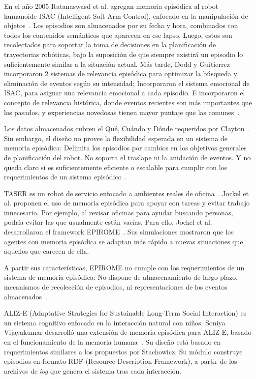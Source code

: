 En el año 2005 Ratanaswasd et al. agregan memoria episódica al robot humanoide ISAC (Intelligent Soft Arm Control), enfocado en la manipulación de objetos~\cite{Ratanaswasd2005}. Los episodios son almacenados por su fecha y hora, combinados con todos los contenidos semánticos que aparecen en ese lapso. Luego, estos son recolectados para soportar la toma de decisiones en la planificación de trayectorias robóticas, bajo la suposición de que siempre existirá un episodio lo suficientemente similar a la situación actual. Más tarde, Dodd y Guitierrez incorporaron 2 sistemas de relevancia episódica para optimizar la búsqueda y eliminación de eventos según su intensidad; Incorporaron el sistema emocional de ISAC, para asignar una relevancia emocional a cada episodio. E incorporaron el concepto de relevancia histórica, donde eventos recientes son más importantes que los pasados, y experiencias novedosas tienen mayor puntaje que las comunes~\cite{Dodd2005}.

Los datos almacenados cubren el Qué, Cuándo y Dónde requeridos por Clayton~\cite{CLAYTON20092330}. Sin embargo, el diseño no provee la flexibilidad esperada en un sistema de memoria episódica:  Delimita los episodios por cambios en los objetivos generales de planificación del robot. No soporta el traslape ni la anidación de eventos. Y no queda claro si es suficientemente eficiente o escalable para cumplir con los requerimientos de un sistema episódico~\cite{Stachowicz2012}.

TASER es un robot de servicio enfocado a ambientes reales de oficina~\cite{Jockel2007}. Jockel et al. proponen el uso de memoria episódica para apoyar con tareas y evitar trabajo innecesario. Por ejemplo, al revisar oficinas para ayudar buscando personas, podría evitar las que usualmente están vacías. Para ello, Jockel et al. desarrollaron el framework EPIROME~\cite{Jockel2007,Jockel2008}. Sus simulaciones mostraron que los agentes con memoria episódica se adaptan más rápido a nuevas situaciones que aquellos que carecen de ella.

A partir sus características, EPIROME no cumple con los requerimientos de un sistema de memoria episódica: No dispone de almacenamiento de largo plazo, mecanismos de recolección de episodios, ni representaciones de los eventos almacenados~\cite{Stachowicz2012}.

ALIZ-E (Adaptative Strategies for Sustainable Long-Term Social Interaction) es un sistema cognitivo enfocado en la interacción natural con niños. Soniya Vijayakumar desarrolló una extensión de memoria episódica para ALIZ-E, basado en el funcionamiento de la memoria humana~\cite{Vijayakumar2014}.  Su diseño está basado en requerimientos similares a los propuestos por Stachowicz. Su módulo construye episodios en formato RDF (Resource Description Framework), a partir de los archivos de \textit{log} que genera el sistema tras cada interacción.

